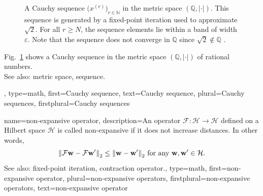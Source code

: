 {{{\begin{figure}
			\caption{A Cauchy sequence 
			$\big(x^{(r)}\big)_{r\in\mathbb{N}}$ 
			in the metric space $\left( \mathbb{Q},|\cdot| \right)$. 
			This sequence is generated by a fixed-point iteration used to approximate 
			$\sqrt{2}$.  For all $r \ge N$, 
			the sequence elements lie within a band of width $\varepsilon$. 
			Note that the sequence does not converge in $\mathbb{Q}$ 
			since $\sqrt{2} \notin \mathbb{Q}$ \cite[Example 1.1.]{RudinBookPrinciplesMatheAnalysis}.\label{fig:fpit_cauchy_sqrt2_dict}}
			\end{figure}
		   Fig.\ \ref{fig:fpit_cauchy_sqrt2_dict} shows a Cauchy sequence in the metric space $\left( \mathbb{Q},|\cdot| \right)$ of 
		   rational numbers.  \\ 
		  See also: metric space, sequence. }, 
		type=math,
		first={Cauchy sequence},
		text={Cauchy sequence},
		plural={Cauchy sequences},
		firstplural={Cauchy sequences}
}

 {name={non-expansive operator},
 	description={An  operator 
	$\mathcal{F}: \mathcal{H} \rightarrow \mathcal{H}$ defined on a 
	Hilbert space $\mathcal{H}$ is called non-expansive if it does 
	not increase distances. 
	In other words,  
 		\begin{equation} 
 			\nonumber
 			\mleft\lVert  \mathcal{F} {\bf w} - \mathcal{F} {\bf w}' \mright\rVert_{2} 
			\leq 	\mleft\lVert {\bf w} - {\bf w}' \mright\rVert_{2} \mbox{ for any } {\bf w}, {\bf w}' \in \mathcal{H}. 
 		\end{equation} 
 		See also: fixed-point iteration, contraction operator.},
 	type=math, 
	first={non-expansive operator},
 	plural={non-expansive operators},
	firstplural={non-expansive operators},
 	text={non-expansive operator}
 }

}

